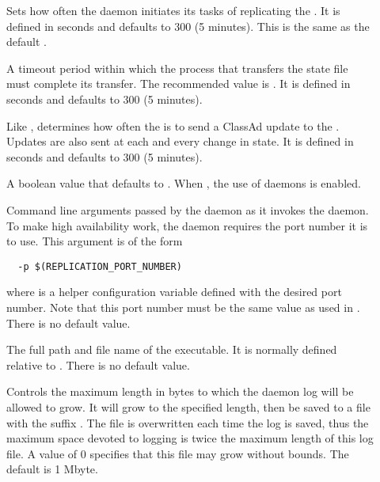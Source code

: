 \begin{description}
\item[]
  \label{param:ReplicationInterval}
  Sets how often the  daemon initiates its tasks of
  replicating the .
  It is defined in seconds and defaults to 300 (5 minutes).
  This is the same as the default .

\item[]
  \label{param:MaxTransferLifetime}
  A timeout period within which the process that
  transfers the state file must complete its transfer.
  The recommended value is
  .
  It is defined in seconds and defaults to 300 (5 minutes).

\item[]
  \label{param:HADUpdateInterval}
  Like ,
  determines how often the  is to send a ClassAd update
  to the .
  Updates are also sent at each and every change in state.
  It is defined in seconds and defaults to 300 (5 minutes).

\item[]
  \label{param:HADUseReplication}
  A boolean value that defaults to .
  When , the use of  daemons is enabled.

\item[]
  \label{param:ReplicationArgs}
  Command line arguments passed by the  daemon
  as it invokes the  daemon.
  To make high availability work, the  daemon
  requires the port number it is to use.
  This argument is of the form
  \begin{verbatim}
  -p $(REPLICATION_PORT_NUMBER)
  \end{verbatim}
  where  is a helper configuration
  variable defined with the desired port number.
  Note that this port number must be the same value as
  used in .
  There is no default value.

\item[]
  \label{param:Replication}
  The full path and file name of the  executable.
  It is normally defined relative to .
  There is no default value.

\item[]
  \label{param:MaxReplicationLog}
  Controls the maximum length in bytes to which the 
  daemon log will be allowed to grow. It will grow to the specified length,
  then be saved to a file with the suffix .
  The   file is overwritten each time the log is saved,
  thus the maximum space devoted to logging is twice the maximum length
  of this log file.
  A value of 0 specifies that this file may grow without bounds.
  The default is 1 Mbyte.


\end{description}
